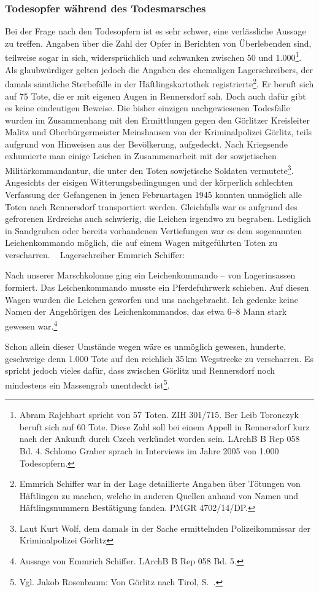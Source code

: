 \documentclass[a4paper,12pt,ngerman,
]{nisebook}
\begin{document}
\subsubsection{Todesopfer während des Todesmarsches}
Bei der Frage nach den Todesopfern ist es sehr schwer, eine verlässliche Aussage zu treffen. Angaben über die Zahl der Opfer in Berichten von Überlebenden sind, teilweise sogar in sich, widersprüchlich und schwanken zwischen 50 und 1.000\footnote{Abram Rajchbart spricht von 57 Toten. ZIH 301/715. Ber Leib Toronczyk beruft sich auf 60 Tote. Diese Zahl soll bei einem Appell in Rennersdorf kurz nach der Ankunft durch Czech verkündet worden sein. LArchB B Rep 058 Bd. 4. Schlomo Graber sprach in Interviews im Jahre 2005 von 1.000 Todesopfern.}. Als glaubwürdiger gelten jedoch die Angaben des ehemaligen Lagerschreibers, der damals sämtliche Sterbefälle in der Häftlingskartothek registrierte\footnote{Emmrich Schiffer war in der Lage detaillierte Angaben über Tötungen von Häftlingen zu machen, welche in anderen Quellen anhand von Namen und Häftlingsnummern Bestätigung fanden. PMGR 4702/14/DP.}. Er beruft sich auf 75 Tote, die er mit eigenen Augen in Rennersdorf sah. Doch auch dafür gibt es keine eindeutigen Beweise.
\newline
Die bisher einzigen nachgewiesenen Todesfälle wurden im Zusammenhang mit den Ermittlungen gegen den Görlitzer Kreisleiter Malitz und Oberbürgermeister Meinshausen von der Kriminalpolizei Görlitz, teils aufgrund von Hinweisen aus der Bevölkerung, aufgedeckt. Nach Kriegsende exhumierte man einige Leichen in Zusammenarbeit mit der sowjetischen Militärkommandantur, die unter den Toten sowjetische Soldaten vermutete\footnote{Laut Kurt Wolf, dem damals in der Sache ermittelnden Polizeikommissar der Kriminalpolizei Görlitz}. 
\newline
Angesichts der eisigen Witterungsbedingungen und der körperlich schlechten Verfassung der Gefangenen in jenen Februartagen 1945 konnten unmöglich alle Toten nach Rennersdorf transportiert werden. Gleichfalls war es aufgrund des gefrorenen Erdreichs auch schwierig, die Leichen irgendwo zu begraben. Lediglich in Sandgruben oder bereits vorhandenen Vertiefungen war es dem sogenannten Leichenkommando möglich, die auf einem Wagen mitgeführten Toten zu verscharren.
~\newline
Lagerschreiber Emmrich Schiffer:
\begin{leftbar} 
Nach unserer Marschkolonne ging ein Leichenkommando -- von Lagerinsassen formiert. Das Leichenkommando musste ein Pferdefuhrwerk schieben. Auf diesen Wagen wurden die Leichen geworfen und uns nachgebracht. 
Ich gedenke keine Namen der Angehörigen des Leichenkommandos, das etwa 6--8 Mann stark gewesen war.\footnote{Aussage von Emmrich Schiffer. LArchB B Rep 058 Bd. 5.} 
\end{leftbar}
Schon allein dieser Umstände wegen wäre es unmöglich gewesen, hunderte, geschweige denn 1.000 Tote auf den reichlich 35\,km Wegstrecke zu verscharren. Es spricht jedoch vieles dafür, dass zwischen Görlitz und Rennersdorf noch mindestens ein Massengrab unentdeckt ist\footnote{Vgl. Jakob Rosenbaum: Von Görlitz nach Tirol, S.~\pageref{rosenbaum}.}.
\end{document}

